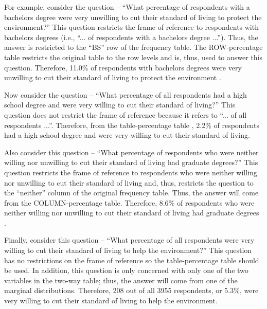 \documentclass[10pt,openany]{book}\usepackage[]{graphicx}\usepackage[]{color}
\begin{document}
For example, consider the question -- ``What percentage of respondents with a bachelors degree were very unwilling to cut their standard of living to protect the environment?''  This question restricts the frame of reference to respondents with bachelors degrees (i.e., ``... of respondents with a bachelors degree ...'').  Thus, the answer is restricted to the ``BS'' row of the frequency table.  The ROW-percentage table restricts the original table to the row levels and is, thus, used to answer this question.  Therefore, 11.0\% of respondents with bachelors degrees were very unwilling to cut their standard of living to protect the environment .

Now consider the question -- ``What percentage of all respondents had a high school degree and were very willing to cut their standard of living?''  This question does not restrict the frame of reference because it refers to ``... of all respondents ...''.  Therefore, from the table-percentage table , 2.2\% of respondents had a high school degree and were very willing to cut their standard of living.

Also consider this question -- ``What percentage of respondents who were neither willing nor unwilling to cut their standard of living had graduate degrees?''  This question restricts the frame of reference to respondents who were neither willing nor unwilling to cut their standard of living and, thus, restricts the question to the ``neither'' column of the original frequency table.  Thus, the answer will come from the COLUMN-percentage table.  Therefore, 8.6\% of respondents who were neither willing nor unwilling to cut their standard of living had graduate degrees .

Finally, consider this question -- ``What percentage of all respondents were very willing to cut their standard of living to help the environment?''  This question has no restrictions on the frame of reference so the table-percentage table should be used.  In addition, this question is only concerned with only one of the two variables in the two-way table; thus, the answer will come from one of the marginal distributions.  Therefore, 208 out of all 3955 respondents, or 5.3\%, were very willing to cut their standard of living to help the environment.

\end{document}
